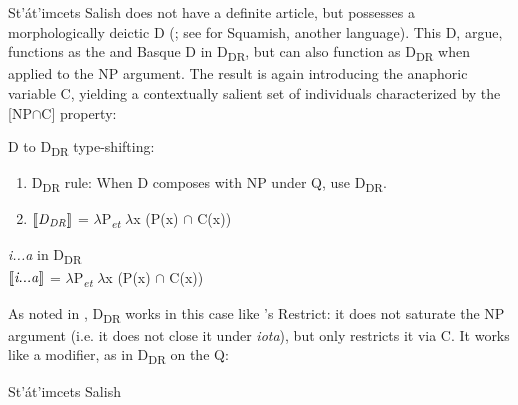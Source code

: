 \documentclass[output=paper,
modfonts
]{langscibook}
\begin{document}
St'\'at'imcets Salish does not have a definite article, but possesses a morphologically deictic D (\citealt{matthewson1998,matthewson2008}; see \citealt{gillon2006,gillon2009} for Squamish, another  language). This D, \citet{etxeberria-giannakidou2009,etxeberria-giannakidou2014} argue, functions as the  and Basque D in D\textsubscript{DR}, but can also function as D\textsubscript{DR} when applied to the NP argument. The result is again introducing the anaphoric variable C, yielding a contextually salient set of individuals characterized by the [NP$\cap$C] property:

\ea\label{ex:etxeberria:35}
	D to D\textsubscript{DR} type-shifting:
\begin{enumerate}
	\item D\textsubscript{DR} rule: When D composes with NP under Q, use D\textsubscript{DR}.
	\item $[\![\text{\textit{D}\textsubscript{\textit{DR}}}]\!]$ = $\lambda$P\textsubscript{\textit{et}} $\lambda$x (P(x) $\cap$ C(x))
\end{enumerate}
\z

\ea\label{ex:etxeberria:36}
	\textit{i...a} in D\textsubscript{DR}\\
	$[\![\text{\textit{i...a}}]\!]$ = $\lambda$P\textsubscript{\textit{et}} $\lambda$x (P(x) $\cap$ C(x))
\z

As noted in \citet{Giannakidou2004}, D\textsubscript{DR} works in this case like \citet{chung-ladusaw2003}'s Restrict: it does not saturate the NP argument (i.e. it does not close it under \textit{iota}), but only restricts it via C. It works like a modifier, as in D\textsubscript{DR} on the Q:

\ea\label{ex:etxeberria:37} St'át'imcets Salish \\
\z
\z

\z
\end{document}
